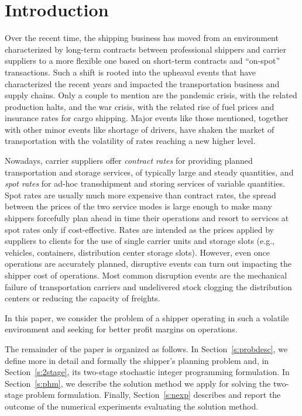 \documentclass[a4paper,11pt]{article}
\begin{document}
	\section{Introduction}
	Over the recent time, the shipping business has moved from an environment characterized by long-term contracts between professional shippers and carrier suppliers to a more flexible one based on short-term contracts and ``on-spot'' transactions.
	Such a shift is rooted into the upheaval events that have characterized the recent years and impacted the transportation business and supply chains.
	Only a couple to mention are the pandemic crisis, with the related production halts, and the war crisis, with the related rise of fuel prices and insurance rates for cargo shipping.
	Major events like those mentioned, together with other minor events like shortage of drivers, have shaken the market of transportation with the volatility of rates reaching a new higher level.
	
	Nowadays, carrier suppliers offer \textit{contract rates} for providing planned transportation and storage services, of typically large and steady quantities, and \textit{spot rates} for ad-hoc transshipment and storing services of variable quantities.
	Spot rates are usually much more expensive than contract rates, the spread between the prices of the two service modes is large enough to make many shippers forcefully plan ahead in time their operations and resort to services at spot rates only if cost-effective.
	Rates are intended as the prices applied by suppliers to clients for the use of single carrier units and storage slots (e.g., vehicles, containers, distribution center storage slots).	
	However, even once operations are accurately planned, disruptive events can turn out impacting the shipper cost of operations.
	Most common disruption events are the mechanical failure of transportation carriers and undelivered stock clogging the distribution centers or reducing the capacity of freights.
	
	In this paper, we consider the problem of a shipper operating in such a volatile environment and seeking for better profit margins on operations.
	
	The remainder of the paper is organized as follows.
	In Section~\ref{s:probdesc}, we define more in detail and formally the shipper's planning problem and, in Section~\ref{s:2stage}, its two-stage stochastic integer programming formulation.
	In Section~\ref{s:phm}, we describe the solution method we apply for solving the two-stage problem formulation.
	Finally, Section~\ref{s:nexp} describes and report the outcome of the numerical experiments evaluating the solution method.
	
\end{document}
